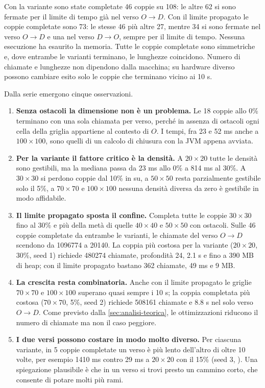 Con la variante  sono state completate 46 coppie su 108: le altre
62 si sono fermate per il limite di tempo già nel verso $O \to D$. Con il
limite propagato le coppie completate sono 73: le stesse 46 più altre 27,
mentre 34 si sono fermate nel verso $O \to D$ e una nel verso $D \to O$,
sempre per il limite di tempo. Nessuna esecuzione ha esaurito la memoria.
Tutte le coppie completate sono simmetriche e, dove entrambe le varianti
terminano, le lunghezze coincidono. Numero di chiamate e lunghezze non
dipendono dalla macchina; su hardware diverso possono cambiare esito solo le
coppie che terminano vicino ai 10 s.

Dalla serie emergono cinque osservazioni.

\begin{enumerate}
  \item \textbf{Senza ostacoli la dimensione non è un problema.} Le 18 coppie
        allo 0\% terminano con una sola chiamata per verso, perché in assenza
        di ostacoli ogni cella della griglia appartiene al contesto di $O$. I
        tempi, fra 23 e 52 ms anche a $100\times100$, sono quelli di un
        calcolo di chiusura con la JVM appena avviata.
  \item \textbf{Per la variante  il fattore critico è la
        densità.} A $20\times20$ tutte le densità sono gestibili, ma la
        mediana passa da 23 ms allo 0\% a 814 ms al 30\%. A $30\times30$ si
        perdono coppie dal 10\% in su, a $50\times50$ resta parzialmente
        gestibile solo il 5\%, a $70\times70$ e $100\times100$ nessuna
        densità diversa da zero è gestibile in modo affidabile.
  \item \textbf{Il limite propagato sposta il confine.} Completa tutte le
        coppie $30\times30$ fino al 30\% e più della metà di quelle
        $40\times40$ e $50\times50$ con ostacoli. Sulle 46 coppie completate da entrambe le varianti,
        le chiamate del verso $O \to D$ scendono da \num{1096774} a
        \num{20140}. La coppia più costosa per la variante 
        ($20\times20$, 30\%, seed 1) richiede \num{480274} chiamate,
        profondità 24, \num{2.1} s e fino a 390 MB di heap; con il limite
        propagato bastano 362 chiamate, 49 ms e 9 MB.
  \item \textbf{La crescita resta combinatoria.} Anche con il limite
        propagato le griglie $70\times70$ e $100\times100$ superano quasi
        sempre i 10 s; la coppia completata più costosa ($70\times70$, 5\%,
        seed 2) richiede \num{508161} chiamate e \num{8.8} s nel solo verso
        $O \to D$. Come previsto dalla \cref{sec:analisi-teorica}, le
        ottimizzazioni riducono il numero di chiamate ma non il caso
        peggiore.
  \item \textbf{I due versi possono costare in modo molto diverso.} Per
        ciascuna variante, in 5 coppie completate un verso è più lento
        dell'altro di oltre 10 volte, per esempio \num{1410} ms contro 29 ms
        a $20\times20$ con il 15\% (seed 3, ). Una spiegazione
        plausibile è che in un verso si trovi presto un cammino corto, che
        consente di potare molti più rami.
\end{enumerate}
